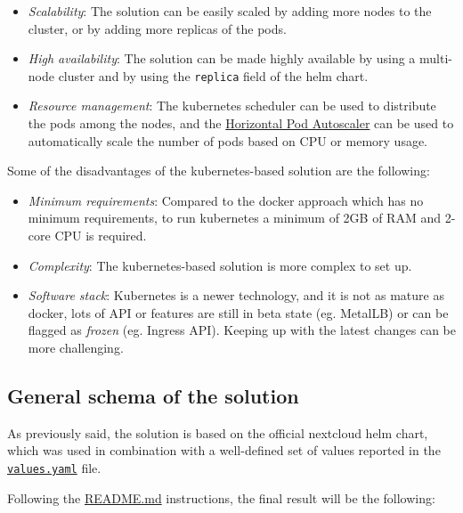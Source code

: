 \begin{itemize}
    \itemsep0em
    \item \textit{Scalability}: The solution can be easily scaled by adding more nodes to the cluster, or by adding more replicas of the pods.
    \item \textit{High availability}: The solution can be made highly available by using a multi-node cluster and by using the \texttt{replica} field of the helm chart. 
    \item \textit{Resource management}: The kubernetes scheduler can be used to distribute the pods among the nodes, and the \href{https://kubernetes.io/docs/tasks/run-application/horizontal-pod-autoscale/}{Horizontal Pod Autoscaler} can be used to automatically scale the number of pods based on CPU or memory usage.
\end{itemize}

Some of the disadvantages of the kubernetes-based solution are the following:

\begin{itemize}
    \itemsep0em
    \item \textit{Minimum requirements}: Compared to the docker approach which has no minimum requirements, to run kubernetes a minimum of 2GB of RAM and 2-core CPU is required.
    \item \textit{Complexity}: The kubernetes-based solution is more complex to set up. 
    \item \textit{Software stack}: Kubernetes is a newer technology, and it is not as mature as docker, lots of API or features are still in beta state (eg. MetalLB) or can be flagged as \textit{frozen} (eg. Ingress API). Keeping up with the latest changes can be more challenging.
\end{itemize}

 
\subsection{General schema of the solution}

As previously said, the solution is based on the official nextcloud helm chart, which was used in combination with a well-defined set of values reported in the \href{https://github.com/IsacPasianotto/cloud-computing-assignment/blob/main/exercise02/nextcloud-helm%26yaml/values.yaml}{\texttt{values.yaml}} file.

Following the \href{https://github.com/IsacPasianotto/cloud-computing-assignment/tree/main/exercise02}{README.md} instructions, the final result will be the following: 

